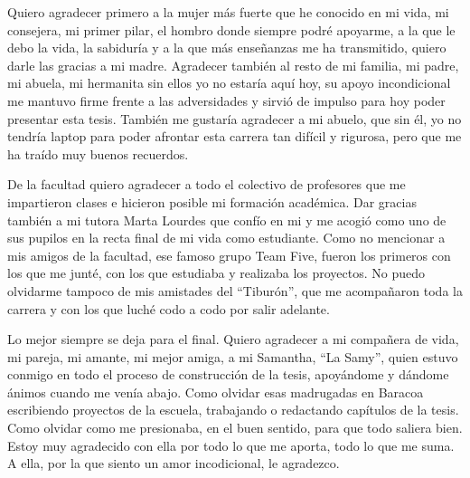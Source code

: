 \begin{acknowledgements}
    Quiero agradecer primero a la mujer m\'as fuerte que he conocido en mi vida, mi consejera,
    mi primer pilar, el hombro donde siempre podr\'e apoyarme, a la que le debo la vida, la 
    sabidur\'ia y a la que m\'as ense\~nanzas me ha transmitido, quiero darle las gracias a 
    mi madre. Agradecer tambi\'en al resto de mi familia, mi padre, mi abuela, mi hermanita
    sin ellos yo no estar\'ia aqu\'i hoy, su apoyo incondicional me mantuvo firme frente a las 
    adversidades y sirvi\'o de impulso para hoy poder presentar esta tesis. Tambi\'en me gustar\'ia
    agradecer a mi abuelo, que sin \'el, yo no tendr\'ia laptop para poder afrontar esta carrera
    tan dif\'icil y rigurosa, pero que me ha tra\'ido muy buenos recuerdos.

    De la facultad quiero agradecer a todo el colectivo de profesores que me impartieron
    clases e hicieron posible mi formaci\'on acad\'emica. Dar gracias tambi\'en a mi tutora
    Marta Lourdes que conf\'io en mi y me acogi\'o como uno de sus pupilos en la recta 
    final de mi vida como estudiante. Como no mencionar a mis amigos de la facultad,
    ese famoso grupo Team Five, fueron los primeros con los que me junt\'e, con los que estudiaba
    y realizaba los proyectos. No puedo olvidarme tampoco de mis amistades del ``Tibur\'on'',
    que me acompa\~naron toda la carrera y con los que luch\'e codo a codo por salir adelante.

    Lo mejor siempre se deja para el final. Quiero agradecer a mi compa\~nera de vida, mi pareja,
    mi amante, mi mejor amiga, a mi Samantha, ``La Samy'', quien estuvo conmigo en todo el proceso
    de construcci\'on de la tesis, apoy\'andome y d\'andome \'animos cuando me ven\'ia abajo.
    Como olvidar esas madrugadas en Baracoa escribiendo proyectos de la escuela, trabajando 
    o redactando cap\'itulos de la tesis. Como olvidar como me presionaba, en el buen sentido,
    para que todo saliera bien. Estoy muy agradecido con ella por todo lo que me aporta, todo lo 
    que me suma. A ella, por la que siento un amor incodicional, le agradezco.
\end{acknowledgements}